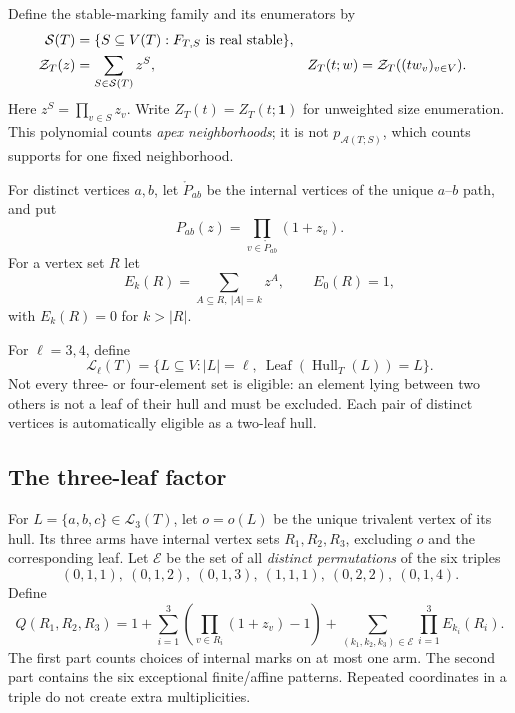 \documentclass[11pt]{article}
\numberwithin{equation}{section}
\theoremstyle{definition}
\newcommand{\one}{\mathbf 1}
\newcommand{\calA}{\mathcal A}
\newcommand{\Hull}{\operatorname{Hull}}
\newcommand{\Leaf}{\operatorname{Leaf}}
\newcommand{\Stab}{\mathcal S}
\newcommand{\Zpoly}{\mathcal Z}
\newcommand{\pathin}[2]{\mathring P_{#1#2}}
\begin{document}
Define the stable-marking family and its enumerators by
\begin{align}
 \Stab(T)&=\{S\subseteq V(T):F_{T,S}\text{ is real stable}\},\notag\\
 \Zpoly_T(z)&=\sum_{S\in\Stab(T)}z^S,
 & Z_T(t;w)&=\Zpoly_T((tw_v)_{v\in V}).
 \label{mts:eq:Z}
\end{align}
Here $z^S=\prod_{v\in S}z_v$. Write $Z_T(t)=Z_T(t;\one)$ for unweighted
size enumeration. This polynomial counts \emph{apex neighborhoods}; it is
not $p_{\calA(T;S)}$, which counts supports for one fixed neighborhood.

For distinct vertices $a,b$, let $\pathin ab$ be the internal vertices of
the unique $a$--$b$ path, and put
\begin{equation}
 P_{ab}(z)=\prod_{v\in\pathin ab}(1+z_v).
 \label{mts:eq:pathproduct}
\end{equation}
For a vertex set $R$ let
\[
 E_k(R)=\sum_{A\subseteq R,\ |A|=k}z^A,
 \qquad E_0(R)=1,
\]
with $E_k(R)=0$ for $k>|R|$.

For $\ell=3,4$, define
\begin{equation}
 \mathcal L_\ell(T)=\{L\subseteq V:|L|=\ell,\ \Leaf(\Hull_T(L))=L\}.
 \label{mts:eq:leafsets}
\end{equation}
Not every three- or four-element set is eligible: an element lying between
two others is not a leaf of their hull and must be excluded. Each pair of
distinct vertices is automatically eligible as a two-leaf hull.

\subsection{The three-leaf factor}

For $L=\{a,b,c\}\in\mathcal L_3(T)$, let $o=o(L)$ be the unique trivalent
vertex of its hull. Its three arms have internal vertex sets
$R_1,R_2,R_3$, excluding $o$ and the corresponding leaf. Let $\mathcal E$
be the set of all \emph{distinct permutations} of the six triples
\begin{equation}
 (0,1,1),\ (0,1,2),\ (0,1,3),\ (1,1,1),\ (0,2,2),\ (0,1,4).
 \label{mts:eq:exceptions}
\end{equation}
Define
\begin{equation}
 Q(R_1,R_2,R_3)
 =1+\sum_{i=1}^3\left(\prod_{v\in R_i}(1+z_v)-1\right)
   +\sum_{(k_1,k_2,k_3)\in\mathcal E}\prod_{i=1}^3E_{k_i}(R_i).
 \label{mts:eq:Q}
\end{equation}
The first part counts choices of internal marks on at most one arm. The
second part contains the six exceptional finite/affine patterns. Repeated
coordinates in a triple do not create extra multiplicities.
\end{document}
